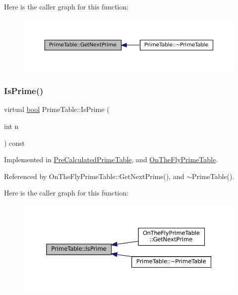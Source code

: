 Here is the caller graph for this function\+:
\nopagebreak
\begin{figure}[H]
\begin{center}
\leavevmode
\includegraphics[width=350pt]{classPrimeTable_ae537c939f56617d8937d57bbbae3ab30_icgraph}
\end{center}
\end{figure}
\mbox{\label{classPrimeTable_a2ab9243364ded0c51541f641b2df362a}} 
\subsubsection{\texorpdfstring{Is\+Prime()}{IsPrime()}}
{\footnotesize\ttfamily virtual \hyperlink{classbool}{bool} Prime\+Table\+::\+Is\+Prime (\begin{DoxyParamCaption}\item[{int}]{n }\end{DoxyParamCaption}) const\hspace{0.3cm}{\ttfamily [pure virtual]}}



Implemented in \hyperlink{classPreCalculatedPrimeTable_a8a9ab7f99b09e5e987933c260e7304cf}{Pre\+Calculated\+Prime\+Table}, and \hyperlink{classOnTheFlyPrimeTable_a1d49b78f79e018441289e79d75680067}{On\+The\+Fly\+Prime\+Table}.



Referenced by On\+The\+Fly\+Prime\+Table\+::\+Get\+Next\+Prime(), and $\sim$\+Prime\+Table().

Here is the caller graph for this function\+:
\nopagebreak
\begin{figure}[H]
\begin{center}
\leavevmode
\includegraphics[width=350pt]{classPrimeTable_a2ab9243364ded0c51541f641b2df362a_icgraph}
\end{center}
\end{figure}


